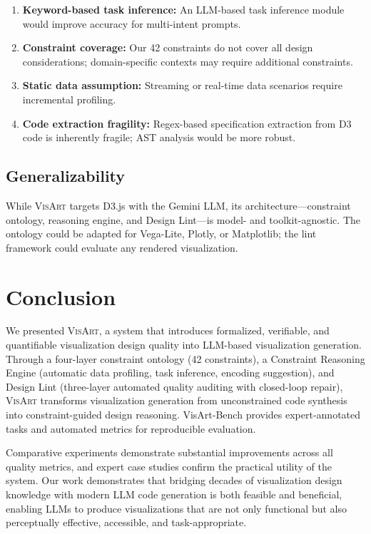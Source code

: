 \documentclass[final,5p,times,twocolumn]{elsarticle}
\newcommand{\sysname}{\textsc{VisArt}}
\begin{document}
\begin{enumerate}
  \item \textbf{Keyword-based task inference:} An LLM-based task inference module would improve accuracy for multi-intent prompts.
  \item \textbf{Constraint coverage:} Our 42 constraints do not cover all design considerations; domain-specific contexts may require additional constraints.
  \item \textbf{Static data assumption:} Streaming or real-time data scenarios require incremental profiling.
  \item \textbf{Code extraction fragility:} Regex-based specification extraction from D3 code is inherently fragile; AST analysis would be more robust.
\end{enumerate}

\subsection{Generalizability}

While \sysname{} targets D3.js with the Gemini LLM, its architecture---constraint ontology, reasoning engine, and Design Lint---is model- and toolkit-agnostic.
The ontology could be adapted for Vega-Lite, Plotly, or Matplotlib;
the lint framework could evaluate any rendered visualization.


\section{Conclusion}

We presented \sysname{}, a system that introduces formalized, verifiable, and quantifiable visualization design quality into LLM-based visualization generation.
Through a four-layer constraint ontology (42 constraints), a Constraint Reasoning Engine (automatic data profiling, task inference, encoding suggestion), and Design Lint (three-layer automated quality auditing with closed-loop repair), \sysname{} transforms visualization generation from unconstrained code synthesis into constraint-guided design reasoning.
VisArt-Bench provides expert-annotated tasks and automated metrics for reproducible evaluation.

Comparative experiments demonstrate substantial improvements across all quality metrics, and expert case studies confirm the practical utility of the system.
Our work demonstrates that bridging decades of visualization design knowledge with modern LLM code generation is both feasible and beneficial, enabling LLMs to produce visualizations that are not only functional but also perceptually effective, accessible, and task-appropriate.




\end{document}
